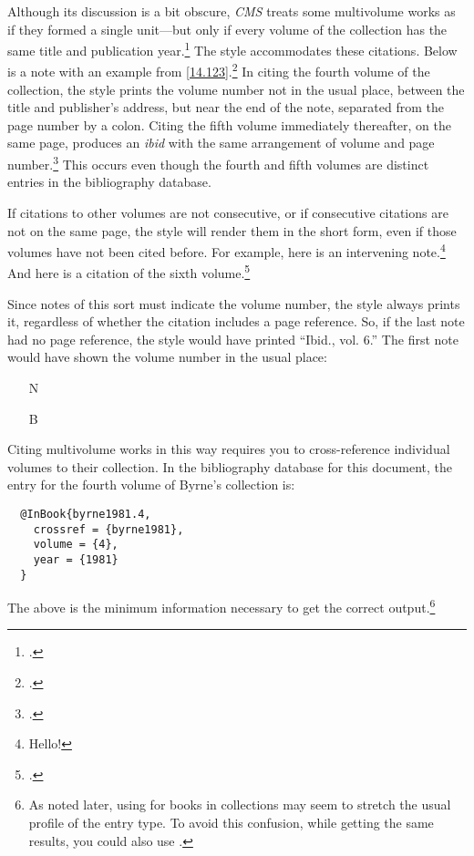 \documentclass[11pt,letterpaper,oneside]{article}
\begin{document}
Although its discussion is a bit obscure, \textit{CMS} treats some
multivolume works as if they formed a single unit---but only if every
volume of the collection has the same title and publication
year.\footcite[See the examples of short citations in 14.29 and
14.122--14.125]{chicago2010} The style accommodates these citations.
Below is a note with an example from
\ref{14.123}.\footcite[243]{byrne1981.4} In citing the fourth volume
of the collection, the style prints the volume number not in the usual
place, between the title and publisher's address, but near the end of
the note, separated from the page number by a colon. Citing the fifth
volume immediately thereafter, on the same page, produces an
\textit{ibid} with the same arrangement of volume and page
number.\footcite[91]{byrne1981.5} This occurs even though the fourth
and fifth volumes are distinct entries in the bibliography database.

If citations to other volumes are not consecutive, or if consecutive
citations are not on the same page, the style will render them in the
short form, even if those volumes have not been cited before. For
example, here is an intervening note.\footnote{Hello!} And here is a
citation of the sixth volume.\footcite[23--32]{byrne1981.6}

Since notes of this sort must indicate the volume number, the style
always prints it, regardless of whether the citation includes a page
reference. So, if the last note had no page reference, the style would
have printed ``Ibid., vol. 6.'' The first note would have shown the
volume number in the usual place:

\begin{itemize}
\item[N] 

\item[B] 
\end{itemize}

Citing multivolume works in this way requires you to cross-reference
individual volumes to their collection. In the bibliography database
for this document, the entry for the fourth volume of Byrne's
collection is:

\begin{lstlisting}
  @InBook{byrne1981.4,
    crossref = {byrne1981},
    volume = {4},
    year = {1981}
  }
\end{lstlisting}

\noindent The above is the minimum information necessary to get the
correct output.\footnote{As noted later, using  for
books in collections may seem to stretch the usual profile of the
entry type. To avoid this confusion, while getting the same results,
you could also use .}
\end{document}
